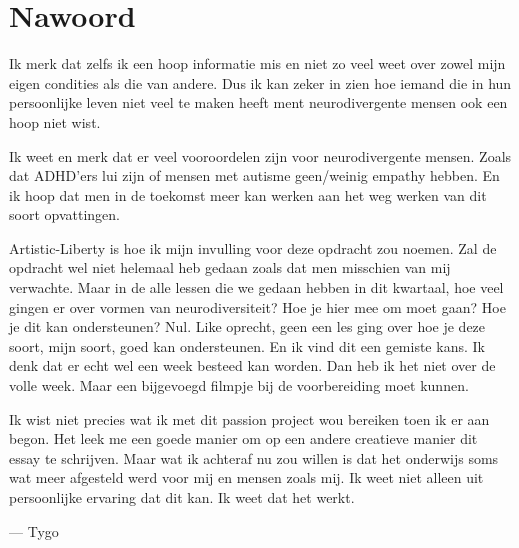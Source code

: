     \section{Nawoord}
        Ik merk dat zelfs ik een hoop informatie mis en niet zo veel weet over zowel mijn eigen condities als die van andere. Dus ik kan zeker in zien hoe iemand die in hun persoonlijke leven niet veel te maken heeft ment neurodivergente mensen ook een hoop niet wist. 

        \bigskip
        
        \noindent Ik weet en merk dat er veel vooroordelen zijn voor neurodivergente mensen. Zoals dat ADHD'ers lui zijn of mensen met autisme geen/weinig empathy hebben. En ik hoop dat men in de toekomst meer kan werken aan het weg werken van dit soort opvattingen. 

        \bigskip
        
        \noindent Artistic-Liberty is hoe ik mijn invulling voor deze opdracht zou noemen. Zal de opdracht wel niet helemaal heb gedaan zoals dat men misschien van mij verwachte. Maar in de alle lessen die we gedaan hebben in dit kwartaal, hoe veel gingen er over vormen van neurodiversiteit? Hoe je hier mee om moet gaan? Hoe je dit kan ondersteunen? Nul. Like oprecht, geen een les ging over hoe je deze soort, mijn soort, goed kan ondersteunen. En ik vind dit een gemiste kans. Ik denk dat er echt wel een week besteed kan worden. Dan heb ik het niet over de volle week. Maar een bijgevoegd filmpje bij de voorbereiding moet kunnen.

        \bigskip
        
        \noindent Ik wist niet precies wat ik met dit passion project wou bereiken toen ik er aan begon. Het leek me een goede manier om op een andere creatieve manier dit essay te schrijven. Maar wat ik achteraf nu zou willen is dat het onderwijs soms wat meer afgesteld werd voor mij en mensen zoals mij. Ik weet niet alleen uit persoonlijke ervaring dat dit kan. Ik weet  dat het werkt. 
        
        \bigskip\bigskip
        
        — Tygo
    
    \label{LastPage}
    \newpage